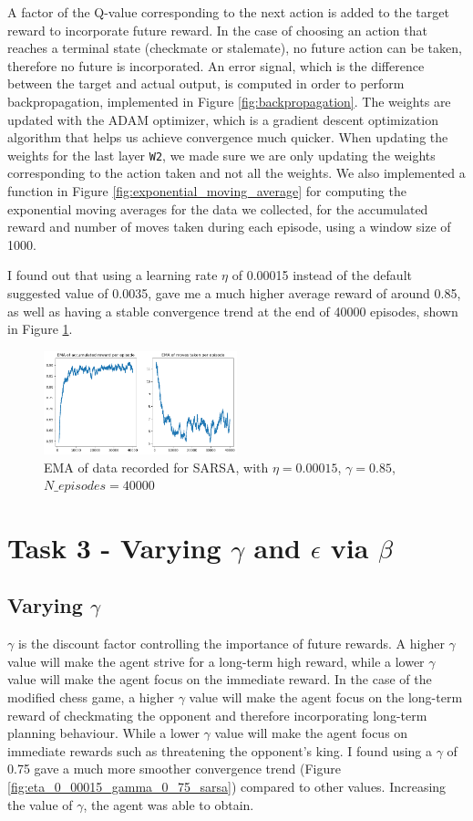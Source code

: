 \documentclass[conference]{IEEEtran}
\begin{document}
A factor of the Q-value corresponding to the next action is added to the target reward to incorporate future reward. In the case of choosing an action that reaches a terminal state (checkmate or stalemate), no future action can be taken, therefore no future is incorporated. An error signal, which is the difference between the target and actual output, is computed in order to perform backpropagation, implemented in Figure \ref{fig:backpropagation}. The weights are updated with the ADAM optimizer, which is a gradient descent optimization algorithm that helps us achieve convergence much quicker. When updating the weights for the last layer \texttt{W2}, we made sure we are only updating the weights corresponding to the action taken and not all the weights. We also implemented a function in Figure \ref{fig:exponential_moving_average} for computing the exponential moving averages for the data we collected, for the accumulated reward and number of moves taken during each episode, using a window size of 1000.

I found out that using a learning rate $\eta$ of 0.00015 instead of the default suggested value of 0.0035, gave me a much higher average reward of around 0.85, as well as having a stable convergence trend at the end of 40000 episodes, shown in Figure \ref{fig:eta_0_00015_sarsa}.

\begin{figure}[htbp]
\centerline{\includegraphics[width=0.5\textwidth]{images/eta_0_00015_sarsa.png}}
\caption{EMA of data recorded for SARSA, with $\eta=0.00015$, $\gamma=0.85$, $N\_episodes=40000$}
\label{fig:eta_0_00015_sarsa}
\end{figure}

\section{Task 3 - Varying $\gamma$ and $\epsilon$ via $\beta$}
\subsection{Varying $\gamma$}
$\gamma$ is the discount factor controlling the importance of future rewards. A higher $\gamma$ value will make the agent strive for a long-term high reward, while a lower $\gamma$ value will make the agent focus on the immediate reward. In the case of the modified chess game, a higher $\gamma$ value will make the agent focus on the long-term reward of checkmating the opponent and therefore incorporating long-term planning behaviour. While a lower $\gamma$ value will make the agent focus on immediate rewards such as threatening the opponent's king. I found using a $\gamma$ of 0.75 gave a much more smoother convergence trend (Figure \ref{fig:eta_0_00015_gamma_0_75_sarsa}) compared to other values. Increasing the value of $\gamma$, the agent was able to obtain.
\end{document}
